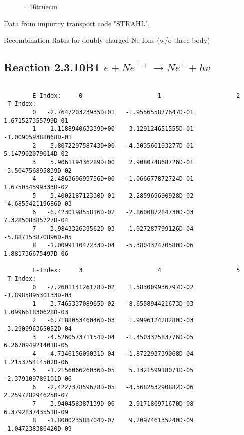 \documentclass[12pt,dvipdfmx]{article}
\begin{document}
{\begin{small}
\begin{verbatim}
\end{verbatim}\end{small}
\begin{figure} \label{2.3.10B0}
\epsfxsize=16truecm
\end{figure}
\newpage
Data from impurity transport code "STRAHL", \cite{kn:Behringer}

  Recombination Rates for doubly charged Ne Ions (w/o three-body)
\subsection{
Reaction 2.3.10B1   $e + Ne^{++}\rightarrow  Ne^+ + hv$
}



\begin{small}\begin{verbatim}

        E-Index:     0                     1                     2
 T-Index:
        0   -2.764720323935D+01   -1.955655877647D-01    1.671527355799D-01
        1    1.118894063339D+00    3.129124651555D-01   -1.009059388068D-01
        2   -5.807229758743D+00   -4.303560193277D-01    5.147902079014D-02
        3    5.906119436289D+00    2.908074868726D-01   -3.504756895839D-02
        4   -2.486369699756D+00   -1.066677872724D-01    1.675054599333D-02
        5    5.400218712330D-01    2.285969690928D-02   -4.685542119686D-03
        6   -6.423019855816D-02   -2.860087284730D-03    7.328508385727D-04
        7    3.984332639562D-03    1.927287799126D-04   -5.887153870896D-05
        8   -1.009911047233D-04   -5.380432470580D-06    1.881736675497D-06

        E-Index:     3                     4                     5
 T-Index:
        0   -7.260114126178D-02    1.583009936797D-02   -1.898589530133D-03
        1    3.746533708965D-02   -8.655894421673D-03    1.099661830628D-03
        2   -6.718805346046D-03    1.999612428280D-03   -3.290996365052D-04
        3   -4.526057371154D-04   -1.450332583776D-05    6.267094921401D-05
        4    4.734615609031D-04   -1.872293739068D-04    1.215375414502D-06
        5   -1.215606626036D-05    5.132159918071D-05   -2.379109789101D-06
        6   -2.422737859678D-05   -4.568253290882D-06    2.259728294625D-07
        7    3.940458387139D-06    2.917180971670D-08    6.379283743551D-09
        8   -1.800023588704D-07    9.209746135240D-09   -1.047238386420D-09


\end{verbatim}
\end{small}}
\end{document}
